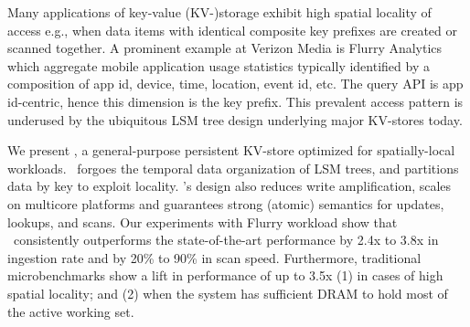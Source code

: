 Many applications of key-value (KV-)storage exhibit high spatial locality
of access e.g., when data items with identical composite key prefixes are created or scanned together.
A prominent example at Verizon Media is Flurry Analytics which aggregate mobile application usage statistics typically 
identified by a composition of app id, device, time, location, event id, etc. The query API is app id-centric, hence this dimension is the key prefix.
This prevalent access pattern is underused by the ubiquitous LSM tree design underlying major KV-stores today.

We present \sys, a general-purpose persistent KV-store optimized for spatially-local workloads.
\sys\ forgoes the temporal data organization of LSM trees, and partitions data by key to exploit locality.
\sys's design also reduces write amplification, scales on multicore platforms and guarantees strong (atomic) semantics for updates, lookups, and scans. 
Our experiments with Flurry workload show that \sys\ consistently outperforms the state-of-the-art performance by 2.4x to 3.8x in ingestion rate and by 20\% to 90\% in scan speed.
Furthermore, traditional microbenchmarks show a lift in performance of up to 3.5x (1) in cases of high spatial locality; and (2) when the system has sufficient DRAM
to hold most of the active working set.

